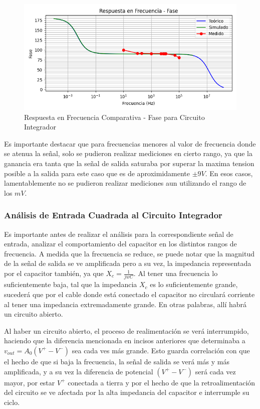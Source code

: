 \begin{figure}[H]
    \centering 
    \includegraphics [scale=1] {../Ejercicio3-CircuitoIntegradoresyDerivadores/Imagenes/comparativo-integrador-fase.png} 
    \caption{Respuesta en Frecuencia Comparativa - Fase para Circuito Integrador}
    \label{fig:emptyPlotTool}
\end{figure}

Es importante destacar que para frecuencias menores al valor de frecuencia donde se atenua la señal, solo se pudieron realizar mediciones en cierto rango,
ya que la ganancia era tanta que la señal de salida saturaba por superar la maxima tension posible a la salida para este caso que es de aproximidamente $\pm 9V$.
En esos casos, lamentablemente no se pudieron realizar mediciones aun utilizando el rango de los $mV$.

\subsubsection{Análisis de Entrada Cuadrada al Circuito Integrador}

Es importante antes de realizar el análisis para la correspondiente señal de entrada, analizar el comportamiento del capacitor en los distintos rangos de frecuencia.
A medida que la frecuencia se reduce, se puede notar que la magnitud de la señal de salida se ve amplificada pero a su vez, la impedancia representada por el capacitor
también, ya que $X_c= \frac{1}{jwC}$. Al tener una frecuencia lo suficientemente baja, tal que la impedancia $X_c$ es lo suficientemente grande, sucederá que por el cable 
donde está conectado el capacitor no circulará corriente al tener una impedancia extremadamente grande. En otras palabras, allí habrá un circuito abierto.

Al haber un circuito abierto, el proceso de realimentación se verá interrumpido, haciendo que la diferencia mencionada en incisos anteriores que determinaba a 
$v_{out}=A_0(V^+-V^-)$ sea cada ves más grande. Esto guarda correlación con que el hecho de que si baja la frecuencia, la señal de salida se verá más y más amplificada,
y a su vez la diferencia de potencial $(V^+-V^-)$ será cada vez mayor, por estar $V^+$ conectada a tierra y por el hecho de que la retroalimentación del circuito se ve afectada
por la alta impedancia del capacitor e interrumple su ciclo.

